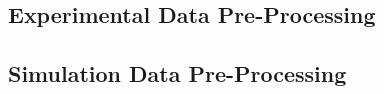 \subsection{Experimental Data Pre-Processing}
     
     
\subsection{Simulation Data Pre-Processing}
   




